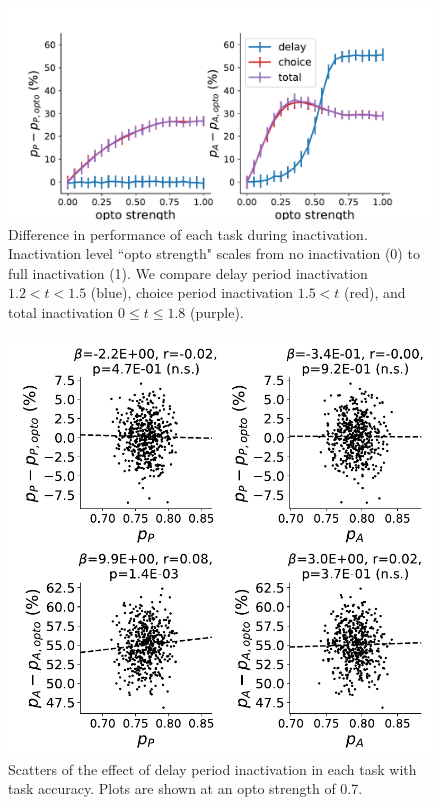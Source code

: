 \documentclass[11pt]{article}
\begin{document}
\begin{figure}
\begin{center}
\includegraphics[scale=0.6]{figs/figSX4.pdf}
\end{center}
\caption{\small 
Difference in performance of each task during inactivation.  Inactivation level ``opto strength" scales from no inactivation (0) to full inactivation (1).  We compare delay period inactivation $1.2 < t < 1.5$ (blue), choice period inactivation $1.5 < t$ (red), and total inactivation $0 \leq t \leq 1.8$ (purple).
}
\label{fig:SX3}
\end{figure}

\begin{figure}
\begin{center}
\includegraphics[scale=0.75]{figs/figSX3.pdf}
\end{center}
\caption{\small Scatters of the effect of delay period inactivation in each task with task accuracy.  Plots are shown at an opto strength of 0.7.
}
\label{fig:SX4}
\end{figure}

%




\end{document}
